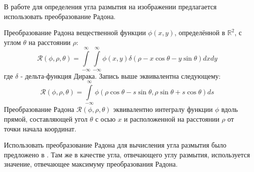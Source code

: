 В работе для определения угла размытия на изображении предлагается использовать преобразование Радона.

Преобразование Радона вещественной функции $\phi(x, y)$,
определённой в $\mathbb{R}^{2}$, с углом $\theta$ на расстоянии $\rho$:
$$
\mathcal{R}(\phi, \rho, \theta)=\int\limits_{-\infty}^{\infty} \int\limits_{-\infty}^{\infty} \phi(x, y) 
\delta(\rho-x \cos \theta-y \sin \theta) d x d y
$$
где $\delta$ - дельта-функция Дирака. Запись выше эквивалентна следующему:
$$
\mathcal{R}(\phi, \rho, \theta)=\int\limits_{-\infty}^{\infty} 
\phi(\rho \cos \theta-s \sin \theta, \rho \sin \theta+s \cos \theta) d s
$$
Преобразование Радона $\mathcal{R}(\phi, \rho, \theta)$ 
эквивалентно интегралу функции $\phi$ вдоль прямой, составляющей угол $\theta$
с осью $x$ и расположенной на расстоянии $\rho$ от точки начала координат. 

\par

Использовать преобразование Радона для вычисления угла размытия было предложено в \cite{moghaddam}. 
Там же в качестве угла, отвечающего углу размытия, используется значение, отвечающее максимуму преобразования Радона. 

